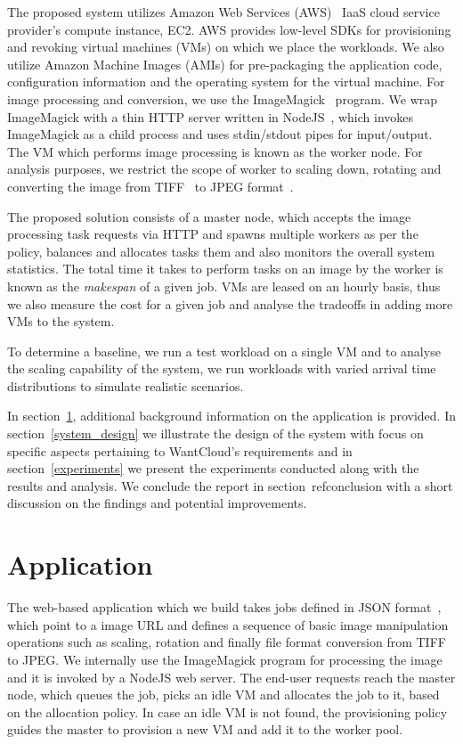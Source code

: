 \documentclass[a4paper]{IEEEtran}
\begin{document}
The proposed system utilizes Amazon Web Services (AWS)~\cite{aws} IaaS cloud service provider's compute instance, EC2.
AWS provides low-level SDKs for provisioning and revoking virtual machines (VMs) on which we place 
the workloads. We also utilize Amazon Machine Images (AMIs) for pre-packaging the application code,
configuration information and the operating system for the virtual machine. For image processing and conversion, we use the ImageMagick~\cite{imagemagick} program. We wrap ImageMagick with a thin HTTP server written in NodeJS~\cite{nodejs}, which invokes ImageMagick as a child process and uses stdin/stdout pipes for input/output. The VM which performs image processing is known as
the worker node. For analysis purposes, we restrict the scope of worker to scaling down, rotating and converting the
image from TIFF~\cite{rfc3302} to JPEG format~\cite{jpeg}.

The proposed solution consists of a master node, which accepts the image processing task requests via HTTP and
spawns multiple workers as per the policy, balances and allocates tasks them and also monitors the overall 
system statistics. The total time it takes to perform tasks on an image by the worker is known as the \emph{makespan} of a given job. VMs are leased on an hourly basis, thus we also measure the cost for a given job and analyse the 
tradeoffs in adding more VMs to the system.

To determine a baseline, we run a test workload on a single VM and to analyse the scaling capability of the system,
we run workloads with varied arrival time distributions to simulate realistic scenarios.

In section~\ref{application}, additional background information on the application is provided. In section~\ref{system_design} we illustrate the design of the system with focus on specific aspects pertaining to
WantCloud's requirements and in section~\ref{experiments} we present the experiments conducted along with the
results and analysis. We conclude the report in section~ref{conclusion} with a short discussion on the findings
and potential improvements.

\section{Application} \label{application}

The web-based application which we build takes jobs defined in JSON format~\cite{rfc7159}, which point to a image URL and defines
a sequence of basic image manipulation operations such as scaling, rotation and finally file format conversion from
TIFF to JPEG.  We internally use the ImageMagick program for processing the image and it is invoked by a NodeJS web
server. The end-user requests reach the master node, which queues the job, picks an idle VM and allocates the job
to it, based on the allocation policy. In case an idle VM is not found, the provisioning policy guides the master
to provision a new VM and add it to the worker pool.
\end{document}
